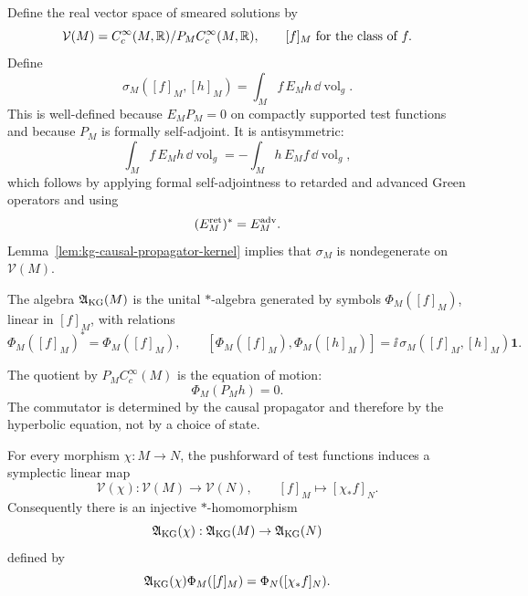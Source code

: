 Define the real vector space of smeared solutions by
\[
  \mathcal V(M)
  =
  C_c^\infty(M,\mathbb R)/P_M C_c^\infty(M,\mathbb R),
  \qquad
  [f]_M \hbox{ for the class of }f .
\]
Define
\begin{equation}
  \sigma_M([f]_M,[h]_M)
  =
  \int_M f\,E_M h\,\dd\operatorname{vol}_g .
  \label{eq:kg-symplectic-form}
\end{equation}
This is well-defined because \(E_MP_M=0\) on compactly supported test
functions and because \(P_M\) is formally self-adjoint.  It is antisymmetric:
\[
  \int_M f\,E_Mh\,\dd\operatorname{vol}_g
  =
  -\int_M h\,E_Mf\,\dd\operatorname{vol}_g ,
\]
which follows by applying formal self-adjointness to retarded and advanced
Green operators and using
\[
  (E_M^{\rm ret})^*=E_M^{\rm adv}.
\]
Lemma~\ref{lem:kg-causal-propagator-kernel} implies that
\(\sigma_M\) is nondegenerate on \(\mathcal V(M)\).

\begin{definition}
\label{def:curved-kg-ccr-algebra}
The algebra \(\mathfrak A_{\rm KG}(M)\) is the unital \(\ast\)-algebra
generated by symbols \(\Phi_M([f]_M)\), linear in \([f]_M\), with relations
\[
  \Phi_M([f]_M)^*=\Phi_M([f]_M),
  \qquad
  [\Phi_M([f]_M),\Phi_M([h]_M)]
  =
  \ii\,\sigma_M([f]_M,[h]_M)\mathbf 1 .
\]
\end{definition}

The quotient by \(P_MC_c^\infty(M)\) is the equation of motion:
\[
  \Phi_M(P_Mh)=0 .
\]
The commutator is determined by the causal propagator and therefore by the
hyperbolic equation, not by a choice of state.

\begin{proposition}
\label{prop:kg-functoriality}
For every morphism \(\chi:M\to N\), the pushforward of test functions
induces a symplectic linear map
\[
  \mathcal V(\chi):\mathcal V(M)\longrightarrow\mathcal V(N),
  \qquad
  [f]_M\longmapsto [\chi_*f]_N .
\]
Consequently there is an injective \(\ast\)-homomorphism
\[
  \mathfrak A_{\rm KG}(\chi):\mathfrak A_{\rm KG}(M)\to
  \mathfrak A_{\rm KG}(N)
\]
defined by
\[
  \mathfrak A_{\rm KG}(\chi)\Phi_M([f]_M)
  =
  \Phi_N([\chi_*f]_N).
\]
\end{proposition}

